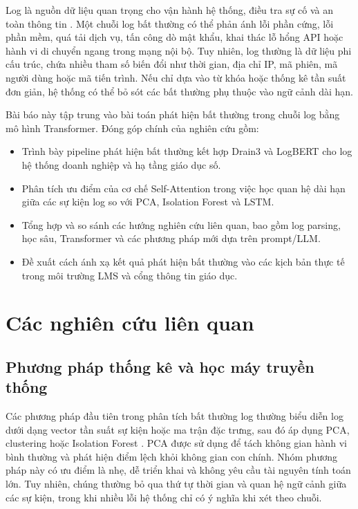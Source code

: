 \documentclass[conference]{IEEEtran}
\begin{document}
Log là nguồn dữ liệu quan trọng cho vận hành hệ thống, điều tra sự cố và an toàn thông tin \cite{b5}. Một chuỗi log bất thường có thể phản ánh lỗi phần cứng, lỗi phần mềm, quá tải dịch vụ, tấn công dò mật khẩu, khai thác lỗ hổng API hoặc hành vi di chuyển ngang trong mạng nội bộ. Tuy nhiên, log thường là dữ liệu phi cấu trúc, chứa nhiều tham số biến đổi như thời gian, địa chỉ IP, mã phiên, mã người dùng hoặc mã tiến trình. Nếu chỉ dựa vào từ khóa hoặc thống kê tần suất đơn giản, hệ thống có thể bỏ sót các bất thường phụ thuộc vào ngữ cảnh dài hạn.

Bài báo này tập trung vào bài toán phát hiện bất thường trong chuỗi log bằng mô hình Transformer. Đóng góp chính của nghiên cứu gồm:
\begin{itemize}
    \item Trình bày pipeline phát hiện bất thường kết hợp Drain3 và LogBERT cho log hệ thống doanh nghiệp và hạ tầng giáo dục số.
    \item Phân tích ưu điểm của cơ chế Self-Attention trong việc học quan hệ dài hạn giữa các sự kiện log so với PCA, Isolation Forest và LSTM.
    \item Tổng hợp và so sánh các hướng nghiên cứu liên quan, bao gồm log parsing, học sâu, Transformer và các phương pháp mới dựa trên prompt/LLM.
    \item Đề xuất cách ánh xạ kết quả phát hiện bất thường vào các kịch bản thực tế trong môi trường LMS và cổng thông tin giáo dục.
\end{itemize}

\section{Các nghiên cứu liên quan}
\subsection{Phương pháp thống kê và học máy truyền thống}
Các phương pháp đầu tiên trong phân tích bất thường log thường biểu diễn log dưới dạng vector tần suất sự kiện hoặc ma trận đặc trưng, sau đó áp dụng PCA, clustering hoặc Isolation Forest \cite{b10,b11}. PCA được sử dụng để tách không gian hành vi bình thường và phát hiện điểm lệch khỏi không gian con chính. Nhóm phương pháp này có ưu điểm là nhẹ, dễ triển khai và không yêu cầu tài nguyên tính toán lớn. Tuy nhiên, chúng thường bỏ qua thứ tự thời gian và quan hệ ngữ cảnh giữa các sự kiện, trong khi nhiều lỗi hệ thống chỉ có ý nghĩa khi xét theo chuỗi.
\end{document}

